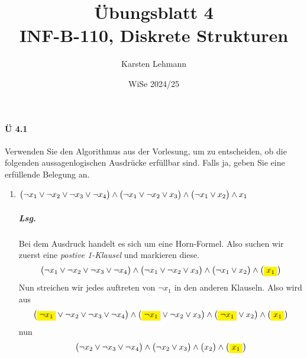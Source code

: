 \documentclass{scrreprt}
\author{Karsten Lehmann}
\date{WiSe 2024/25}
\title{Übungsblatt 4\\INF-B-110, Diskrete Strukturen}
\begin{document}
\paragraph{Ü 4.1} Verwenden Sie den Algorithmus aus der Vorlesung, um zu
entscheiden, ob die folgenden aussagenlogischen Ausdrücke erfüllbar sind.
Falls ja, geben Sie eine erfüllende Belegung an.

\begin{enumerate}[(1)]
\item $\qty\big(\neg x_1 \lor \neg x_2 \lor \neg x_3 \lor \neg x_4) \land
  \qty\big(\neg x_1 \lor \neg x_2 \lor x_3) \land
  \qty\big(\neg x_1 \lor x_2) \land x_1$

  \subparagraph{Lsg.} Bei dem Ausdruck handelt es sich um eine Horn-Formel.
  Also suchen wir zuerst eine \emph{postive 1-Klausel} und markieren diese.
  \[
    \qty\big(\neg x_1 \lor \neg x_2 \lor \neg x_3 \lor \neg x_4) \land
    \qty\big(\neg x_1 \lor \neg x_2 \lor x_3) \land
    \qty\big(\neg x_1 \lor x_2) \land \qty\big(\colorbox{yellow}{$x_1$})
  \]
  Nun streichen wir jedes auftreten von $\neg x_1$ in den anderen Klauseln.
  Also wird aus
  \[
    \qty\big(\colorbox{yellow}{$\neg x_1$} \lor \neg x_2 \lor \neg x_3 \lor \neg x_4) \land
    \qty\big(\colorbox{yellow}{$\neg x_1$} \lor \neg x_2 \lor x_3) \land
    \qty\big(\colorbox{yellow}{$\neg x_1$} \lor x_2) \land \qty\big(\colorbox{yellow}{$x_1$})
  \]
  nun
  \[
    \qty\big(\neg x_2 \lor \neg x_3 \lor \neg x_4) \land
    \qty\big(\neg x_2 \lor x_3) \land
    \qty\big(x_2) \land \qty\big(\colorbox{yellow}{$x_1$})
  \]


\end{enumerate}
\end{document}
